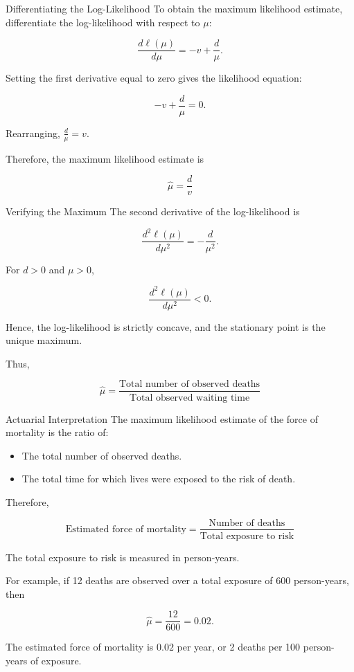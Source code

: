 \documentclass[
  ignorenonframetext,
  aspectratio=169,
]{beamer}
\providecommand{\tightlist}{%
  \setlength{\itemsep}{0pt}\setlength{\parskip}{0pt}}
\begin{document}
\begin{frame}{Differentiating the Log-Likelihood}
\protect{}\label{differentiating-the-log-likelihood}
To obtain the maximum likelihood estimate, differentiate the
log-likelihood with respect to \(\mu\):

\[
\frac{d\ell(\mu)}{d\mu}
=-v+\frac{d}{\mu}.
\]

Setting the first derivative equal to zero gives the likelihood
equation:

\[
-v+\frac{d}{\mu}=0.
\]

Rearranging, \(\frac{d}{\mu}=v.\)

Therefore, the maximum likelihood estimate is

\[
\boxed{
\hat{\mu}=\frac{d}{v}
}
\]
\end{frame}

\begin{frame}{Verifying the Maximum}
\protect{}\label{verifying-the-maximum}
The second derivative of the log-likelihood is

\[
\frac{d^2\ell(\mu)}{d\mu^2}
=-\frac{d}{\mu^2}.
\]

For \(d>0\) and \(\mu>0\),

\[
\frac{d^2\ell(\mu)}{d\mu^2}<0.
\]

Hence, the log-likelihood is strictly concave, and the stationary point
is the unique maximum.

Thus,

\[
\boxed{
\hat{\mu}=\frac{\text{Total number of observed deaths}}
{\text{Total observed waiting time}}
}
\]
\end{frame}

\begin{frame}{Actuarial Interpretation}
\protect{}\label{actuarial-interpretation}
The maximum likelihood estimate of the force of mortality is the ratio
of:

\begin{itemize}
\tightlist
\item
  The total number of observed deaths.
\item
  The total time for which lives were exposed to the risk of death.
\end{itemize}

Therefore,

\[
\boxed{
\text{Estimated force of mortality}
=
\frac{\text{Number of deaths}}
{\text{Total exposure to risk}}
}
\]

The total exposure to risk is measured in person-years.

For example, if 12 deaths are observed over a total exposure of 600
person-years, then

\[
\hat{\mu}=\frac{12}{600}=0.02.
\]

The estimated force of mortality is \(0.02\) per year, or 2 deaths per
100 person-years of exposure.
\end{frame}
\end{document}
